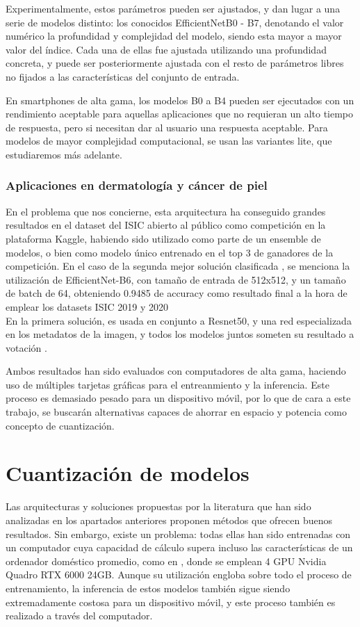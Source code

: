 Experimentalmente, estos parámetros pueden ser ajustados, y dan lugar a una serie de modelos distinto: los conocidos EfficientNetB0 - B7, denotando el valor numérico la profundidad y complejidad del modelo, siendo esta mayor a mayor valor del índice.	 Cada una de ellas fue ajustada utilizando una profundidad concreta, y puede ser posteriormente ajustada con el resto de parámetros libres no fijados a las características del conjunto de entrada.

En smartphones de alta gama, los modelos B0 a B4 pueden ser ejecutados con un rendimiento aceptable para aquellas aplicaciones que no requieran un alto tiempo de respuesta, pero si necesitan dar al usuario una respuesta aceptable. Para modelos de mayor complejidad computacional, se usan las variantes lite, que estudiaremos más adelante.


\subsubsection{Aplicaciones en dermatología y cáncer de piel}

En el problema que nos concierne, esta arquitectura ha conseguido grandes resultados en el dataset del ISIC abierto al público como competición en la plataforma Kaggle, habiendo sido utilizado como parte de un ensemble de modelos, o bien como modelo único entrenado en el top 3 de ganadores de la competición. En el caso de la segunda mejor solución clasificada \cite{2ndISIC}, se menciona la utilización de EfficientNet-B6, con tamaño de entrada de 512x512, y un tamaño de batch de 64, obteniendo 0.9485 de accuracy como resultado final a la hora de emplear los datasets ISIC 2019 y 2020\\ En la primera solución, es usada en conjunto a Resnet50, y una red especializada en los metadatos de la imagen, y todos los modelos juntos someten su resultado a votación \cite{1stISIC}.

Ambos resultados han sido evaluados con computadores de alta gama, haciendo uso de múltiples tarjetas gráficas para el entreanmiento y la inferencia. Este proceso es demasiado pesado para un dispositivo móvil, por lo que de cara a este trabajo, se buscarán alternativas capaces de ahorrar en espacio y potencia como concepto de cuantización.

 \section{Cuantización de modelos}
\label{cap:cuantización}
Las arquitecturas y soluciones propuestas por la literatura que han sido analizadas en los apartados anteriores proponen métodos que ofrecen buenos resultados. Sin embargo, existe un problema: todas ellas han sido entrenadas con un computador cuya capacidad de cálculo supera incluso las características de un ordenador doméstico promedio, como en \cite{2ndISIC}, donde se emplean 4  GPU Nvidia Quadro RTX 6000 24GB. Aunque su utilización engloba sobre todo el proceso de entrenamiento, la inferencia de estos modelos también sigue siendo extremadamente costosa para un dispositivo móvil, y este proceso también es realizado a través del computador.

